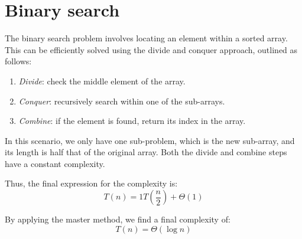 \section{Binary search}

The binary search problem involves locating an element within a sorted array. 
This can be efficiently solved using the divide and conquer approach, outlined as follows:
\begin{enumerate}
    \item \textit{Divide}: check the middle element of the array.
    \item \textit{Conquer}: recursively search within one of the sub-arrays.
    \item \textit{Combine}: if the element is found, return its index in the array.
\end{enumerate}
In this scenario, we only have one sub-problem, which is the new sub-array, and its length is half that of the original array.
Both the divide and combine steps have a constant complexity.

Thus, the final expression for the complexity is:
\[T(n)=1T\left(\dfrac{n}{2}\right)+\Theta(1)\]

By applying the master method, we find a final complexity of:
\[T(n)=\Theta(\log n)\]